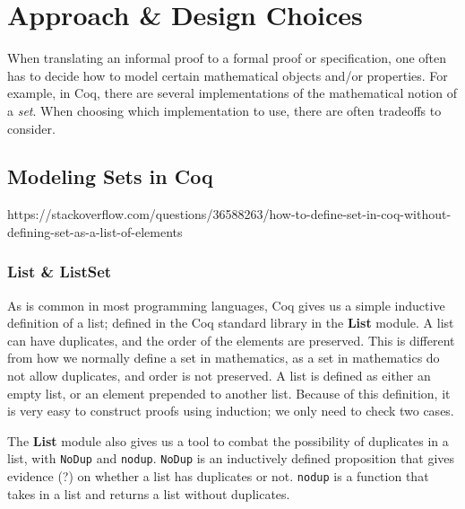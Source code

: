 \chapter{Approach \& Design Choices}

When translating an informal proof to a formal proof or specification,
one often has to decide how to model certain mathematical objects
and/or properties. For example, in Coq, there are several implementations
of the mathematical notion of a \textit{set}. When choosing which implementation
to use, there are often tradeoffs to consider.

\section{Modeling Sets in Coq}

https://stackoverflow.com/questions/36588263/how-to-define-set-in-coq-without-defining-set-as-a-list-of-elements

\subsection{List \& ListSet}

As is common in most programming languages, Coq gives us a simple inductive definition of a list;
defined in the Coq standard library in the \textbf{List} module.
A list can have duplicates, and the order of the elements are preserved. This is different from how we normally
define a set in mathematics, as a set in mathematics do not allow duplicates, and order is not preserved.
A list is defined as either an empty list, or an element prepended to another list.
Because of this definition, it is very easy to construct proofs using induction; we only need to check two cases.

\newpage

The \textbf{List} module also gives us a tool to combat the possibility of duplicates in a list,
with \texttt{NoDup} and \texttt{nodup}. \texttt{NoDup} is an inductively defined proposition that gives evidence (?)
on whether a list has duplicates or not. \texttt{nodup} is a function that takes in a list and returns a list without duplicates.

